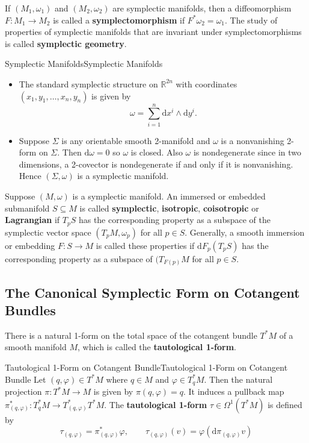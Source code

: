 \documentclass[../main.tex]{subfiles}
\begin{document}
If $(M_1, \omega_1)$ and $(M_2, \omega_2)$ are symplectic manifolds, then a diffeomorphism $F: M_1 \to M_2$ is called a \textbf{symplectomorphism} if $F^* \omega_2 = \omega_1$. The study of properties of symplectic manifolds that are invariant under symplectomorphisms is called \textbf{symplectic geometry}.

\begin{example}{Symplectic Manifolds}{Symplectic Manifolds}
  \begin{itemize}
    \item The standard symplectic structure on $\mathbb{R}^{2n}$ with coordinates $(x_1, y_1, \dots, x_n, y_n)$ is given by
      \begin{equation*}
        \omega = \sum_{i=1}^n \mathrm{d} x^i \wedge \mathrm{d} y^i.
      \end{equation*}
    \item Suppose $\Sigma$ is any orientable smooth 2-manifold and $\omega$ is a nonvanishing 2-form on $\Sigma$. Then $\mathrm{d} \omega = 0$ so $\omega$ is closed. Also $\omega$ is nondegenerate since in two dimensions, a 2-covector is nondegenerate if and only if it is nonvanishing. Hence $(\Sigma, \omega)$ is a symplectic manifold.
  \end{itemize}
\end{example}

Suppose $(M, \omega)$ is a symplectic manifold. An immersed or embedded submanifold $S \subseteq M$ is called \textbf{symplectic}, \textbf{isotropic}, \textbf{coisotropic} or \textbf{Lagrangian} if $T_p S$ has the corresponding property as a subspace of the symplectic vector space $(T_p M, \omega_p)$ for all $p\in S$. Generally, a smooth immersion or embedding $F: S \to M$ is called these properties if $\mathrm{d} F_p(T_p S)$ has the corresponding property as a subspace of $(T_{F(p)} M$ for all $p\in S$.

\subsection{The Canonical Symplectic Form on Cotangent Bundles}
There is a natural 1-form on the total space of the cotangent bundle $T^* M$ of a smooth manifold $M$, which is called the \textbf{tautological 1-form}.

\begin{definition}{Tautological 1-Form on Cotangent Bundle}{Tautological 1-Form on Cotangent Bundle}
  Let $(q, \varphi) \in T^* M$ where $q\in M$ and $\varphi \in T_q^* M$. Then the natural projection $\pi: T^* M \to M$ is given by $\pi(q, \varphi) = q$. It induces a pullback map $\pi_{(q, \varphi)}^*: T_q^* M \to T_{(q, \varphi)}^* T^* M$. The \textbf{tautological 1-form} $\tau \in \Omega^1(T^* M)$ is defined by
  \begin{equation}
    \tau_{(q, \varphi)} = \pi_{(q, \varphi)}^* \varphi, \qquad \tau_{(q, \varphi)}(v) = \varphi(\mathrm{d} \pi_{(q, \varphi)} v)
  \end{equation}
\end{definition}
\end{document}
